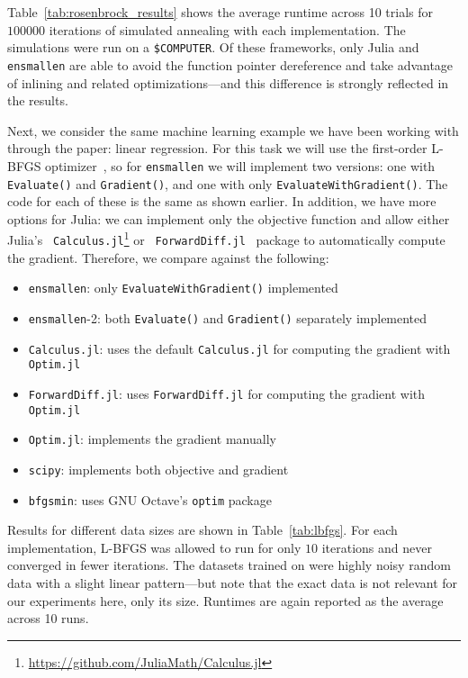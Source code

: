 \documentclass{article}
\begin{document}
Table~\ref{tab:rosenbrock_results} shows the average runtime
across 10 trials for $100000$ iterations of simulated annealing with each
implementation.  The simulations were run on a %
{\tt \$COMPUTER}.
Of these frameworks, only Julia and {\tt ensmallen} are able to avoid the
function pointer dereference and take advantage of inlining and related
optimizations---and this difference is strongly reflected in the results.

Next, we consider the same machine learning example we have been working with
through the paper: linear regression.  For this task we will use the first-order
L-BFGS optimizer~\cite{zhu1997algorithm},
so for {\tt ensmallen} we will implement two versions: one with {\tt Evaluate()}
and {\tt Gradient()}, and one with only {\tt EvaluateWithGradient()}.  The code
for each of these is the same as shown earlier.  In addition, we have more
options for Julia: we can implement only the objective function and allow either
Julia's {\tt
Calculus.jl}\footnote{\url{https://github.com/JuliaMath/Calculus.jl}} or {\tt
ForwardDiff.jl}~\cite{RevelsLubinPapamarkou2016} package to automatically
compute the gradient.  Therefore, we compare against the following:

\vspace*{-0.3em}
\begin{itemize} \itemsep -1pt
  \item {\tt ensmallen}: only {\tt EvaluateWithGradient()} implemented
  \item {\tt ensmallen}-2: both {\tt Evaluate()} and {\tt Gradient()} separately
implemented
  \item {\tt Calculus.jl}: uses the default {\tt Calculus.jl} for
computing the gradient with {\tt Optim.jl}
  \item {\tt ForwardDiff.jl}: uses {\tt ForwardDiff.jl} for computing
the gradient with {\tt Optim.jl}
  \item {\tt Optim.jl}: implements the gradient manually
  \item {\tt scipy}: implements both objective and
gradient
  \item {\tt bfgsmin}: uses GNU Octave's {\tt optim} package
\end{itemize}
\vspace*{-0.3em}

Results for different data sizes are shown in Table~\ref{tab:lbfgs}.  For each
implementation, L-BFGS was allowed to run for only $10$ iterations and never
converged in fewer iterations.  The datasets trained on were highly noisy random
data with a slight linear pattern---but note that the exact data is not relevant
for our experiments here, only its size.  Runtimes are again reported as the
average across 10 runs.
\end{document}
